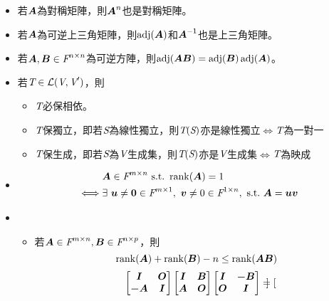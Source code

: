 \begin{itemize}
    \item 若$\boldsymbol{A}$為對稱矩陣，則$\boldsymbol{A}^n$也是對稱矩陣。
    \item 若$\boldsymbol{A}$為可逆上三角矩陣，則$\operatorname{adj}(\boldsymbol{A})$和$\boldsymbol{A}^{\mathsf{-1}}$也是上三角矩陣。
    \item 若$\boldsymbol{A}, \boldsymbol{B} \in \textit{F}^{n \times n}$為可逆方陣，則$\operatorname{adj}(\boldsymbol{\boldsymbol{AB}}) = \operatorname{adj}(\boldsymbol{\boldsymbol{B}})\operatorname{adj}(\boldsymbol{\boldsymbol{A}})$。
    \item 若$\textit{T} \in \mathcal{L}(\textit{V}, \textit{V}')$，則
	\begin{itemize}
		\item $\textit{T}$必保相依。
		\item $\textit{T}$保獨立，即若$\textit{S}$為線性獨立，則$\textit{T}(\textit{S})$亦是線性獨立$\iff$$\textit{T}$為一對一
		\item $\textit{T}$保生成，即若$\textit{S}$為$\textit{V}$生成集，則$\textit{T}(\textit{S})$亦是$\textit{V}$生成集$\iff$$\textit{T}$為映成
    \end{itemize}
    \item \quad\quad \begin{equation}
		\begin{aligned}
			& \mat{A} \in \F^{m \times n} \ \text{s.t.} \ \rnk(\mat{A}) = 1 \\ 
			\iff & \exists \ \vec{u} \neq \vec{0} \in \F^{m \times 1}, \ \vec{v} \neq 0 \in \F^{1 \times n}, \ \text{s.t.} \ \mat{A} = \vec{uv}	
		\end{aligned}
    \end{equation}
    \item \begin{itemize}
		\item 若$\boldsymbol{A} \in \textit{F}^{m \times n}, \boldsymbol{B} \in \textit{F}^{n \times p}$，則 \begin{equation}
			\operatorname{rank}(\boldsymbol{A}) + \operatorname{rank}(\boldsymbol{B}) - n \le \operatorname{rank}(\boldsymbol{AB})
		\end{equation}\begin{equation}
			\begin{bmatrix}
				\boldsymbol{I} & \boldsymbol{O} \\
				\boldsymbol{-A} & \boldsymbol{I}
			\end{bmatrix}
			\begin{bmatrix}
				\boldsymbol{I} & \boldsymbol{B} \\
				\boldsymbol{A} & \boldsymbol{O}
			\end{bmatrix}
			\begin{bmatrix}
				\boldsymbol{I} & \boldsymbol{-B} \\
				\boldsymbol{O} & \boldsymbol{I}
			\end{bmatrix} = 
			\begin{bmatrix}

\end{bmatrix}
\end{equation}
\end{itemize}
\end{itemize}
